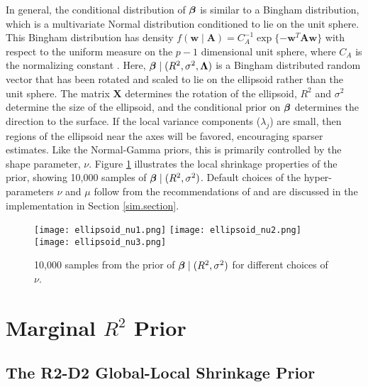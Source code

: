 \documentclass[12pt]{article}
\newcommand{\A}{{\bm  A}}
\newcommand{\X}{{\bm  X}}
\newcommand{\Lambdabf}{{\mathbf \Lambda}}
\newcommand{\wbf}{{\bm w}}
\newcommand{\greekbold}[1]{\mbox{\boldmath $#1$}}
\newcommand{\betabf}{\greekbold{\beta}}
\newcommand{\s}{{\sigma^2}}
\newcommand{\R}{{R^2}}
\begin{document}
In general, the conditional distribution of $\betabf$ is similar to a Bingham distribution, which is a multivariate Normal distribution conditioned to lie on the unit sphere.
This Bingham distribution has density $f(\wbf\mid  \A) = C_A^{-1} \exp\{ -\wbf^T\A\wbf\}$ with respect to the uniform measure on the $p-1$ dimensional unit sphere, where $C_A$ is the normalizing constant \citep{bingham1974antipodally}.
Here, $\betabf\mid  (R^2, \s, \Lambdabf)$ is a Bingham distributed random vector that has been rotated and scaled to lie on the ellipsoid rather than the unit sphere.
The matrix $\X$ determines the rotation of the ellipsoid, $R^2$ and $\sigma^2$ determine the size of the ellipsoid, and the conditional prior on $\betabf$ determines the direction to the surface.
If the local variance components ($\lambda_j$) are small, then regions of the ellipsoid near the axes will be favored, encouraging sparser estimates.
Like the Normal-Gamma priors, this is primarily controlled by the shape parameter, $\nu$.
Figure \ref{fig:ellipsoids} illustrates the local shrinkage properties of the prior, showing 10,000 samples of $\betabf \mid  (R^2, \sigma^2)$.
Default choices of the hyper-parameters $\nu$ and $\mu$ follow from the recommendations of \cite{griffin2010inference} and are discussed in the implementation in Section \ref{sim.section}.

\begin{figure}[htbp]
   \centering
   \texttt{[image: ellipsoid\_nu1.png]}  \hfill
   \texttt{[image: ellipsoid\_nu2.png]}  \hfill
   \texttt{[image: ellipsoid\_nu3.png]}
   \caption{10,000 samples from the prior of $\betabf\mid (\R, \sigma^2)$ for different choices of $\nu$.}
   \label{fig:ellipsoids}
\end{figure}


\section{Marginal $\R$ Prior} \label{section:marginal R2-D2}
\subsection{The R2-D2 Global-Local Shrinkage Prior}
\end{document}
